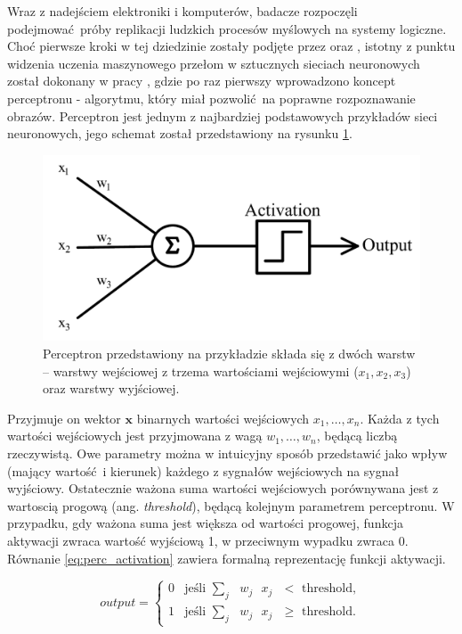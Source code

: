 \documentclass[12pt,a4paper,twoside]{article}
\begin{document}
Wraz z nadejściem elektroniki i komputerów, badacze rozpoczęli podejmować próby replikacji ludzkich procesów myślowych na systemy logiczne. Choć pierwsze kroki w tej dziedzinie zostały podjęte przez \citet{mcculloch1943} oraz \citet{hebb1949}, istotny z punktu widzenia uczenia maszynowego przełom w sztucznych sieciach neuronowych został dokonany w pracy \citet{rosenblatt1957}, gdzie po raz pierwszy wprowadzono koncept perceptronu - algorytmu, który miał pozwolić na poprawne rozpoznawanie obrazów. Perceptron jest jednym z najbardziej podstawowych przykładów sieci neuronowych, jego schemat został przedstawiony na rysunku \ref{fig:perceptron}.

\begin{figure}[h]
  \centering
\includegraphics[scale=0.6]{../obrazy/fig:perceptron.png}
\caption{Perceptron przedstawiony na przykładzie składa się z dwóch warstw – warstwy wejściowej z trzema wartościami wejściowymi (\(x_1, x_2, x_3 \)) oraz warstwy wyjściowej. \label{fig:perceptron}}
\end{figure}

Przyjmuje on wektor \(\mathbf{x}\) binarnych wartości wejściowych \(x_1, \ldots, x_n \). Każda z tych wartości wejściowych jest przyjmowana z wagą \(w_1, \ldots, w_n \), będącą liczbą rzeczywistą. Owe parametry można w intuicyjny sposób przedstawić jako wpływ (mający wartość i kierunek) każdego z sygnałów wejściowych na sygnał wyjściowy. Ostatecznie ważona suma wartości wejściowych porównywana jest z wartoscią progową (ang. \textit{threshold}), będącą kolejnym parametrem perceptronu. W przypadku, gdy ważona suma jest większa od wartości progowej, funkcja aktywacji zwraca wartość wyjściową 1, w przeciwnym wypadku zwraca 0. Równanie \ref{eq:perc_activation} zawiera formalną reprezentację funkcji aktywacji.

\begin{equation} \label{eq:perc_activation}
  output=\begin{cases}
    0& \text{jeśli $\sum_j$ $w_j$ $x_j$ $<$ threshold},\\
    1& \text{jeśli $\sum_j$ $w_j$ $x_j$ $\geq$ threshold}.
  \end{cases}
\end{equation}
\end{document}
